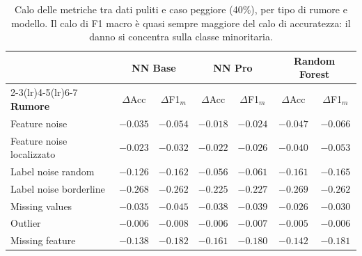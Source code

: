 \begin{table}[H]\centering\small
\setlength{\tabcolsep}{5pt}
\caption{Calo delle metriche tra dati puliti e caso peggiore (40\%), per tipo di rumore e modello. Il calo di F1 macro è quasi sempre maggiore del calo di accuratezza: il danno si concentra sulla classe minoritaria.}\label{tab:delta}
\begin{tabular}{l cc cc cc}
\toprule
 & \multicolumn{2}{c}{NN Base} & \multicolumn{2}{c}{NN Pro} & \multicolumn{2}{c}{Random Forest}\\
\cmidrule(lr){2-3}\cmidrule(lr){4-5}\cmidrule(lr){6-7}
\textbf{Rumore} & $\Delta$Acc & $\Delta$F1$_m$ & $\Delta$Acc & $\Delta$F1$_m$ & $\Delta$Acc & $\Delta$F1$_m$ \\
\midrule
Feature noise            & $-0.035$ & $-0.054$ & $-0.018$ & $-0.024$ & $-0.047$ & $-0.066$ \\
Feature noise localizzato & $-0.023$ & $-0.032$ & $-0.022$ & $-0.026$ & $-0.040$ & $-0.053$ \\
Label noise random       & $-0.126$ & $-0.162$ & $-0.056$ & $-0.061$ & $-0.161$ & $-0.165$ \\
Label noise borderline   & $-0.268$ & $-0.262$ & $-0.225$ & $-0.227$ & $-0.269$ & $-0.262$ \\
Missing values           & $-0.035$ & $-0.045$ & $-0.038$ & $-0.039$ & $-0.026$ & $-0.030$ \\
Outlier                  & $-0.006$ & $-0.008$ & $-0.006$ & $-0.007$ & $-0.005$ & $-0.006$ \\
Missing feature          & $-0.138$ & $-0.182$ & $-0.161$ & $-0.180$ & $-0.142$ & $-0.181$ \\
\bottomrule
\end{tabular}
\end{table}

